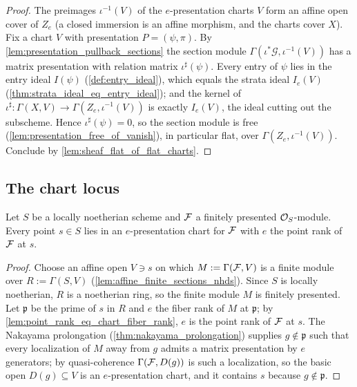 \begin{proof}
  \leanok
  The preimages \(\iota^{-1}(V)\) of the \(e\)-presentation charts \(V\)
  form an affine open cover of \(Z_e\) (a closed immersion is an affine
  morphism, and the charts cover \(X\)).  Fix a chart \(V\) with
  presentation \(P = (\psi, \pi)\).  By
  \cref{lem:presentation_pullback_sections} the section module
  \(\Gamma(\iota^*\mathcal G, \iota^{-1}(V))\) has a matrix presentation
  with relation matrix \(\iota^\sharp(\psi)\).  Every entry of \(\psi\) lies
  in the entry ideal \(I(\psi)\) (\cref{def:entry_ideal}), which equals the
  strata ideal \(I_e(V)\) (\cref{thm:strata_ideal_eq_entry_ideal}); and the
  kernel of \(\iota^\sharp : \Gamma(X, V) \to \Gamma(Z_e, \iota^{-1}(V))\)
  is exactly \(I_e(V)\), the ideal cutting out the subscheme.  Hence
  \(\iota^\sharp(\psi) = 0\), so the section module is free
  (\cref{lem:presentation_free_of_vanish}), in particular flat, over
  \(\Gamma(Z_e, \iota^{-1}(V))\).  Conclude by
  \cref{lem:sheaf_flat_of_flat_charts}.
\end{proof}

\subsection{The chart locus}

\begin{theorem}
  \label{thm:presentation_chart_exists}
  \leanok
  Let \(S\) be a locally noetherian scheme and \(\mathcal{F}\) a finitely presented
  \(\mathcal{O}_S\)-module.  Every point \(s \in S\) lies in an \(e\)-presentation
  chart for \(\mathcal{F}\) with \(e\) the point rank of \(\mathcal{F}\) at \(s\).
\end{theorem}

\begin{proof}
  \leanok
  Choose an affine open \(V \ni s\) on which \(M := \Gamma(\mathcal{F}, V)\) is a
  finite module over \(R := \Gamma(S, V)\)
  (\cref{lem:affine_finite_sections_nhds}).  Since \(S\) is locally
  noetherian, \(R\) is a noetherian ring, so the finite module \(M\) is
  finitely presented.  Let \(\mathfrak p\) be the prime of \(s\) in \(R\)
  and \(e\) the fiber rank of \(M\) at \(\mathfrak p\); by
  \cref{lem:point_rank_eq_chart_fiber_rank}, \(e\) is the point rank of
  \(\mathcal{F}\) at \(s\).  The Nakayama prolongation
  (\cref{thm:nakayama_prolongation}) supplies \(g \notin \mathfrak p\) such
  that every localization of \(M\) away from \(g\) admits a matrix
  presentation by \(e\) generators; by quasi-coherence
  \(\Gamma(\mathcal{F}, D(g))\) is such a localization, so the basic open
  \(D(g) \subseteq V\) is an \(e\)-presentation chart, and it contains
  \(s\) because \(g \notin \mathfrak p\).
\end{proof}

